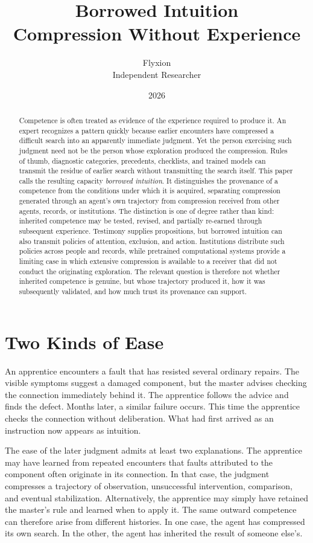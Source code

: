 \documentclass[11pt]{article}
\title{\textbf{Borrowed Intuition}\\[0.3em]
\large Compression Without Experience}
\author{Flyxion \\ Independent Researcher}
\date{2026}
\begin{document}
\maketitle

\begin{abstract}
Competence is often treated as evidence of the experience required to produce it. An expert recognizes a pattern quickly because earlier encounters have compressed a difficult search into an apparently immediate judgment. Yet the person exercising such judgment need not be the person whose exploration produced the compression. Rules of thumb, diagnostic categories, precedents, checklists, and trained models can transmit the residue of earlier search without transmitting the search itself. This paper calls the resulting capacity \emph{borrowed intuition}. It distinguishes the provenance of a competence from the conditions under which it is acquired, separating compression generated through an agent's own trajectory from compression received from other agents, records, or institutions. The distinction is one of degree rather than kind: inherited competence may be tested, revised, and partially re-earned through subsequent experience. Testimony supplies propositions, but borrowed intuition can also transmit policies of attention, exclusion, and action. Institutions distribute such policies across people and records, while pretrained computational systems provide a limiting case in which extensive compression is available to a receiver that did not conduct the originating exploration. The relevant question is therefore not whether inherited competence is genuine, but whose trajectory produced it, how it was subsequently validated, and how much trust its provenance can support.
\end{abstract}

\section{Two Kinds of Ease}

An apprentice encounters a fault that has resisted several ordinary repairs. The visible symptoms suggest a damaged component, but the master advises checking the connection immediately behind it. The apprentice follows the advice and finds the defect. Months later, a similar failure occurs. This time the apprentice checks the connection without deliberation. What had first arrived as an instruction now appears as intuition.

The ease of the later judgment admits at least two explanations. The apprentice may have learned from repeated encounters that faults attributed to the component often originate in its connection. In that case, the judgment compresses a trajectory of observation, unsuccessful intervention, comparison, and eventual stabilization. Alternatively, the apprentice may simply have retained the master's rule and learned when to apply it. The same outward competence can therefore arise from different histories. In one case, the agent has compressed its own search. In the other, the agent has inherited the result of someone else's.
\end{document}
